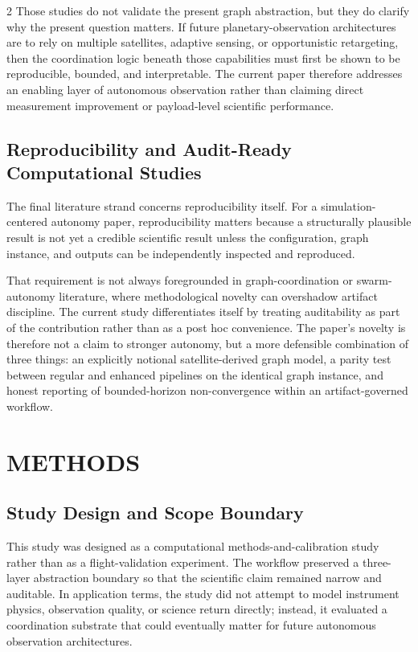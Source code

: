 \documentclass[fleqn,10pt,letterpaper]{article}
\begin{document}
\begin{multicols}{2}
Those studies do not validate the present graph abstraction, but they do clarify why the present question matters. If future planetary-observation architectures are to rely on multiple satellites, adaptive sensing, or opportunistic retargeting, then the coordination logic beneath those capabilities must first be shown to be reproducible, bounded, and interpretable. The current paper therefore addresses an enabling layer of autonomous observation rather than claiming direct measurement improvement or payload-level scientific performance.


\subsection{Reproducibility and Audit-Ready Computational Studies}

The final literature strand concerns reproducibility itself. For a simulation-centered autonomy paper, reproducibility matters because a structurally plausible result is not yet a credible scientific result unless the configuration, graph instance, and outputs can be independently inspected and reproduced.

That requirement is not always foregrounded in graph-coordination or swarm-autonomy literature, where methodological novelty can overshadow artifact discipline. The current study differentiates itself by treating auditability as part of the contribution rather than as a post hoc convenience. The paper's novelty is therefore not a claim to stronger autonomy, but a more defensible combination of three things: an explicitly notional satellite-derived graph model, a parity test between regular and enhanced pipelines on the identical graph instance, and honest reporting of bounded-horizon non-convergence within an artifact-governed workflow.


\section{METHODS}


\subsection{Study Design and Scope Boundary}

This study was designed as a computational methods-and-calibration study rather than as a flight-validation experiment. The workflow preserved a three-layer abstraction boundary so that the scientific claim remained narrow and auditable. In application terms, the study did not attempt to model instrument physics, observation quality, or science return directly; instead, it evaluated a coordination substrate that could eventually matter for future autonomous observation architectures.


\end{multicols}
\end{document}
